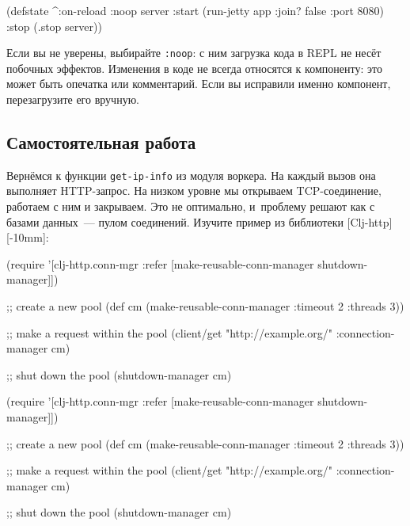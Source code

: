 \else

\begin{english}
  \begin{clojure}
(defstate
  ^{:on-reload :noop}
  server
  :start (run-jetty app {:join? false :port 8080})
  :stop (.stop server))
  \end{clojure}
\end{english}

\fi

Если вы не уверены, выбирайте \verb|:noop|: с ним загрузка кода в REPL не несёт
побочных эффектов. Изменения в коде не всегда относятся к компоненту: это может
быть опечатка или комментарий. Если вы исправили именно компонент, перезагрузите
его вручную.

\subsection{Самостоятельная работа}


Вернёмся к функции \verb|get-ip-info| из модуля воркера. На каждый вызов она
выполняет HTTP-запрос. На низком уровне мы открываем TCP-соединение, работаем с
ним и закрываем. Это не оптимально, и~проблему решают как с базами данных~---
пулом соединений. Изучите пример из библиотеки
[Clj-http][-10mm]:

\ifx\DEVICETYPE\MOBILE

\begin{english}
  \begin{clojure}
(require
 '[clj-http.conn-mgr :refer
   [make-reusable-conn-manager
    shutdown-manager]])

;; create a new pool
(def cm (make-reusable-conn-manager
         {:timeout 2 :threads 3}))

;; make a request within the pool
(client/get "http://example.org/"
            {:connection-manager cm})

;; shut down the pool
(shutdown-manager cm)
  \end{clojure}
\end{english}

\else

\begin{english}
  \begin{clojure}
(require
 '[clj-http.conn-mgr :refer
   [make-reusable-conn-manager
    shutdown-manager]])

;; create a new pool
(def cm (make-reusable-conn-manager
         {:timeout 2 :threads 3}))

;; make a request within the pool
(client/get "http://example.org/"
            {:connection-manager cm})

;; shut down the pool
(shutdown-manager cm)
  \end{clojure}
\end{english}


